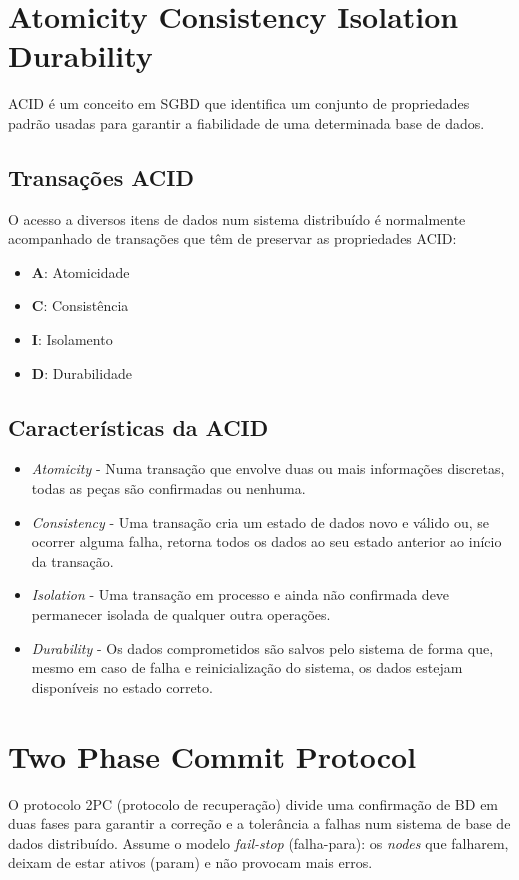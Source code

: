 \section{Atomicity Consistency Isolation Durability}
\ac{ACID} é um conceito em \ac{SGBD} que identifica um conjunto de propriedades padrão usadas para garantir a fiabilidade de uma determinada base de dados.


\subsection{Transações ACID}
O acesso a diversos itens de dados num sistema distribuído é normalmente acompanhado de transações que têm de preservar as propriedades \ac{ACID}:
\begin{itemize}
    \item \textbf{A}: Atomicidade
    \item \textbf{C}: Consistência
    \item \textbf{I}: Isolamento
    \item \textbf{D}: Durabilidade
\end{itemize}


\subsection{Características da ACID}
\begin{itemize}
    \item \textit{Atomicity} - Numa transação que envolve duas ou mais informações discretas, todas as peças são confirmadas ou nenhuma.
    \item \textit{Consistency} - Uma transação cria um estado de dados novo e válido ou, se ocorrer alguma falha, retorna todos os dados ao seu estado anterior ao início da transação.
    \item \textit{Isolation} - Uma transação em processo e ainda não confirmada deve permanecer isolada de qualquer outra operações.
    \item \textit{Durability} - Os dados comprometidos são salvos pelo sistema de forma que, mesmo em caso de falha e reinicialização do sistema, os dados estejam disponíveis no estado correto.
\end{itemize}

\cleardoublepage

\section{Two Phase Commit Protocol}
O protocolo \ac{2PC} (protocolo de recuperação) divide uma confirmação de \ac{BD} em duas fases para garantir a correção e a tolerância a falhas num sistema de base de dados distribuído. Assume o modelo \textit{fail-stop} (falha-para): os \textit{nodes} que falharem, deixam de estar ativos (param) e não provocam mais erros. 

